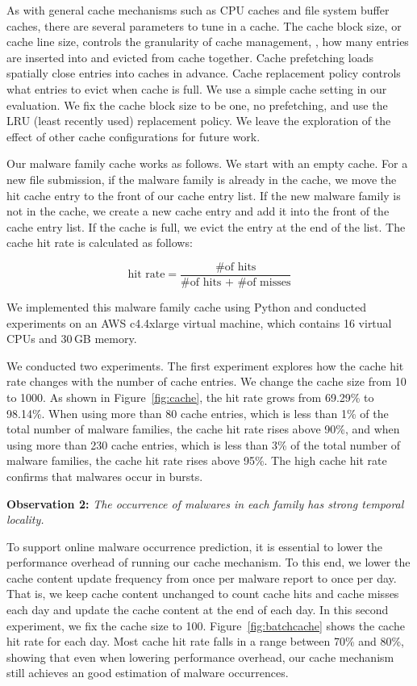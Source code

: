 As with general cache mechanisms such as CPU caches and file system buffer caches, 
there are several parameters to tune in a cache.
The cache block size, or cache line size, controls the granularity of cache management, 
\ie, how many entries are inserted into and evicted from cache together.
Cache prefetching loads spatially close entries into caches in advance. 
Cache replacement policy controls what entries to evict when cache is full.
We use a simple cache setting in our evaluation. 
We fix the cache block size to be one, no prefetching, 
and use the LRU (least recently used) replacement policy.
We leave the exploration of the effect of other cache configurations for future work. 

Our malware family cache works as follows.
We start with an empty cache. 
For a new file submission, if the malware family is already in the cache, 
we move the hit cache entry to the front of our cache entry list. 
If the new malware family is not in the cache, 
we create a new cache entry and add it into the front of the cache entry list.
If the cache is full, we evict the entry at the end of the list. 
The cache hit rate is calculated as follows: 

$$ \mbox{hit rate} = \dfrac{\mbox{\# of hits}}{\mbox{\# of hits + \# of misses}}$$

We implemented this malware family cache using Python
and conducted experiments on an AWS c4.4xlarge virtual machine, 
which contains 16 virtual CPUs and 30\,GB memory.

We conducted two experiments. 
The first experiment explores how the cache hit rate changes with the number of cache entries. 
We change the cache size from 10 to 1000. 
As shown in Figure~\ref{fig:cache}, the hit rate grows from 69.29\% to 98.14\%. 
When using more than 80 cache entries, which is less than 1\% of the total number of malware families, the cache hit rate rises above 90\%, 
and when using more than 230 cache entries, which is less than 3\% of the total number of malware families, 
the cache hit rate rises above 95\%. 
The high cache hit rate confirms that malwares occur in bursts.

{\bf Observation 2:} 
{\em The occurrence of malwares in each family has strong temporal locality.}  

To support online malware occurrence prediction, it is essential to lower the 
performance overhead of running our cache mechanism.
To this end, we lower the cache content update frequency from once per malware report to once per day.
That is, we keep cache content unchanged to count cache hits and cache misses each day and update the cache content at the end of each day.
In this second experiment, we fix the cache size to 100. 
Figure~\ref{fig:batchcache} shows the cache hit rate for each day. 
Most cache hit rate falls in a range between 70\% and 80\%,
showing that even when lowering performance overhead, our cache mechanism still achieves an good estimation of malware occurrences.  


